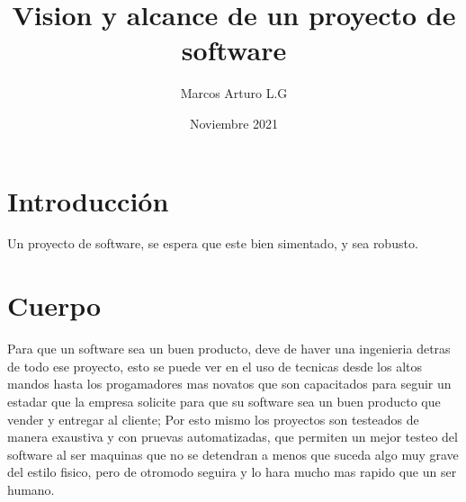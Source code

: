 \documentclass{article}
\title{Vision y alcance de un proyecto de software}
\author{Marcos Arturo L.G}
\date{Noviembre 2021}
\begin{document}
\maketitle

\section{Introducción}
Un proyecto de software, se espera que este bien simentado, y sea robusto.

\section{Cuerpo}
Para que un software sea un buen producto, deve de haver una ingenieria detras de todo ese proyecto, esto se puede ver en el uso de tecnicas desde los altos mandos hasta los progamadores mas novatos que son capacitados para seguir un estadar que la empresa solicite para que su software sea un buen producto que vender y entregar al cliente; Por esto mismo los proyectos son testeados de manera exaustiva y con pruevas automatizadas, que permiten un mejor testeo del software al ser maquinas que no se detendran a menos que suceda algo muy grave del estilo fisico, pero de otromodo seguira y lo hara mucho mas rapido que un ser humano.
\end{document}
